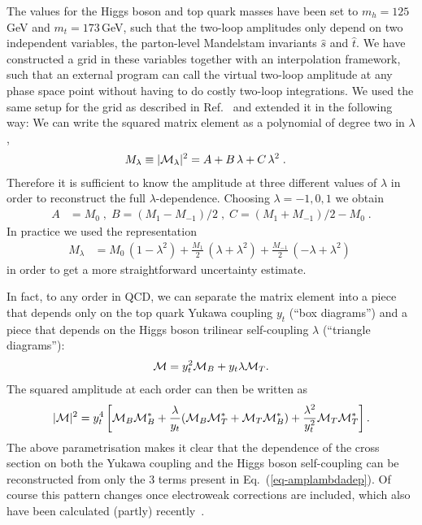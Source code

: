 The values for the Higgs boson and top quark masses have been set to
$m_h=125$\,GeV and $m_t=173$\,GeV, such that the two-loop amplitudes
only depend on two independent variables, the parton-level Mandelstam invariants
$\hat{s}$ and $\hat{t}$.  We have constructed a grid in these
variables together with an interpolation framework, such that an
external program can call the virtual two-loop amplitude at any phase space
point without having to do costly two-loop integrations.
We used the same setup for the grid as described in Ref.~\cite{Heinrich:2017kxx} and extended it in the following way:
We can write the squared matrix element as a polynomial of degree two in $\lambda$, 
\begin{align}
M_\lambda& \equiv |{\cal M}_\lambda|^2=A+B\,\lambda + C\,\lambda^2\;. \label{eq-amplambdadep}
\end{align}
Therefore it is sufficient to know the amplitude at three different values of $\lambda$ in order to reconstruct the full $\lambda$-dependence. 
Choosing $\lambda=-1,0,1$ we obtain
\begin{align}
A&=M_0\;,\; B=(M_1-M_{-1})/2\;,\; C=(M_1+M_{-1})/2-M_0\;.
\end{align}
In practice we used the representation 
\begin{align}
M_\lambda &=M_0\,(1-\lambda^2)+\frac{M_1}{2}\,(\lambda+\lambda^2) + \frac{M_{-1}}{2}\,(-\lambda+\lambda^2)\;
\end{align}
in order to get a more straightforward uncertainty estimate.

In fact, to any order in QCD,  we can separate the matrix element into a 
piece that depends only on the top quark Yukawa coupling $y_t$ (``box diagrams'') and a 
piece that depends on the Higgs boson trilinear self-coupling $\lambda$ (``triangle diagrams''):
\begin{align}
{\cal M} = y_t^2 {\cal M}_B + y_t \lambda {\cal M}_T.
\end{align}
The squared amplitude at each order can then be written as
\begin{align}
|{\cal M}|^2 = y_t^4 \left[ {\cal M}_B {\cal M}_B^* + \frac{\lambda}{y_t} ({\cal M}_B {\cal M}_T^* + {\cal M}_T {\cal M}_B^* ) +  \frac{\lambda^2}{y_t^2} {\cal M}_T {\cal M}_T^*  \right].
\end{align}
The above parametrisation makes it clear that the dependence of the cross section on
both the Yukawa coupling and the Higgs boson self-coupling can be reconstructed
from only the 3 terms present in Eq.~(\ref{eq-amplambdadep}).
Of course this pattern changes once electroweak corrections are
included, which also have been calculated (partly) recently~\cite{Bizon:2018syu,Borowka:2018pxx}. 


